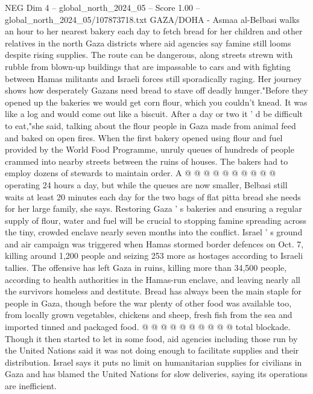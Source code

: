 \begin{textsample}{NEG Dim 4 – global\_north\_2024\_05 – Score 1.00 – global\_north\_2024\_05/107873718.txt}  \label{ex:f4_neg_123}
GAZA/DOHA - Asmaa al-Belbasi walks an hour to her nearest bakery each day to fetch bread for her children and other relatives in the north Gaza districts where aid agencies say famine still looms despite rising supplies.
The route can be dangerous, along streets strewn with rubble from blown-up buildings that are impassable to cars and with fighting between Hamas militants and Israeli forces still sporadically raging.
Her journey shows how desperately Gazans need bread to stave off deadly hunger."Before they opened up the bakeries we would get corn flour, which you couldn't knead.
It was like a log and would come out like a biscuit.
After a day or two it ' d be difficult to eat,"she said, talking about the flour people in Gaza made from animal feed and baked on open fires.
When the first bakery opened using flour and fuel provided by the World Food Programme, unruly queues of hundreds of people crammed into nearby streets between the ruins of houses.
The bakers had to employ dozens of stewards to maintain order.
A @ @ @ @ @ @ @ @ @ @ operating 24 hours a day, but while the queues are now smaller, Belbasi still waits at least 20 minutes each day for the two bags of flat pitta bread she needs for her large family, she says.
Restoring Gaza ' s bakeries and ensuring a regular supply of flour, water and fuel will be crucial to stopping famine spreading across the tiny, crowded enclave nearly seven months into the conflict.
Israel ' s ground and air campaign was triggered when Hamas stormed border defences on Oct. 7, killing around 1,200 people and seizing 253 more as hostages according to Israeli tallies.
The offensive has left Gaza in ruins, killing more than 34,500 people, according to health authorities in the Hamas-run enclave, and leaving nearly all the survivors homeless and destitute.
Bread has always been the main staple for people in Gaza, though before the war plenty of other food was available too, from locally grown vegetables, chickens and sheep, fresh fish from the sea and imported tinned and packaged food. @ @ @ @ @ @ @ @ @ @ total blockade.
Though it then started to let in some food, aid agencies including those run by the United Nations said it was not doing enough to facilitate supplies and their distribution.
Israel says it puts no limit on humanitarian supplies for civilians in Gaza and has blamed the United Nations for slow deliveries, saying its operations are inefficient.

\end{textsample}
